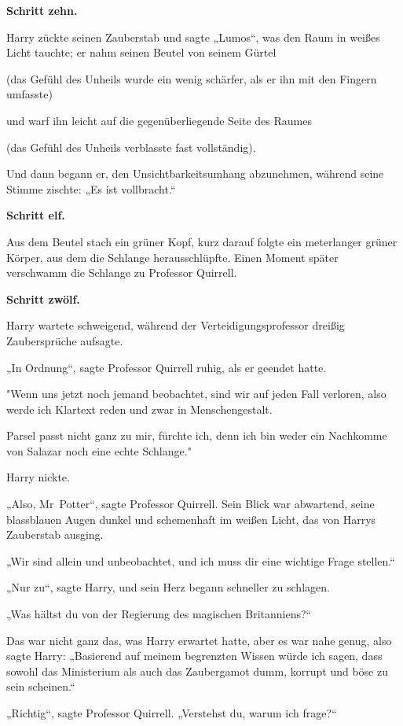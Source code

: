 {\textbf{Schritt zehn.}

Harry zückte seinen Zauberstab und sagte „Lumos“, was den Raum in weißes Licht tauchte; er nahm seinen Beutel von seinem Gürtel

(das Gefühl des Unheils wurde ein wenig schärfer, als er ihn mit den Fingern umfasste)

und warf ihn leicht auf die gegenüberliegende Seite des Raumes

(das Gefühl des Unheils verblasste fast vollständig).

Und dann begann er, den Unsichtbarkeitsumhang abzunehmen, während seine Stimme zischte: „Es ist vollbracht.“

\textbf{Schritt elf.}

Aus dem Beutel stach ein grüner Kopf, kurz darauf folgte ein meterlanger grüner Körper, aus dem die Schlange herausschlüpfte. Einen Moment später verschwamm die Schlange zu Professor Quirrell.

\textbf{Schritt zwölf.}

Harry wartete schweigend, während der Verteidigungsprofessor dreißig Zaubersprüche aufsagte.

„In Ordnung“, sagte Professor Quirrell ruhig, als er geendet hatte.

"Wenn uns jetzt noch jemand beobachtet, sind wir auf jeden Fall verloren, also werde ich Klartext reden und zwar in Menschengestalt.

Parsel passt nicht ganz zu mir, fürchte ich, denn ich bin weder ein Nachkomme von Salazar noch eine echte Schlange."

Harry nickte.

„Also, Mr~Potter“, sagte Professor Quirrell. Sein Blick war abwartend, seine blassblauen Augen dunkel und schemenhaft im weißen Licht, das von Harrys Zauberstab ausging.

„Wir sind allein und unbeobachtet, und ich muss dir eine wichtige Frage stellen.“

„Nur zu“, sagte Harry, und sein Herz begann schneller zu schlagen.

„Was hältst du von der Regierung des magischen Britanniens?“

Das war nicht ganz das, was Harry erwartet hatte, aber es war nahe genug, also sagte Harry: „Basierend auf meinem begrenzten Wissen würde ich sagen, dass sowohl das Ministerium als auch das Zaubergamot dumm, korrupt und böse zu sein scheinen.“

„Richtig“, sagte Professor Quirrell. „Verstehst du, warum ich frage?“

}
